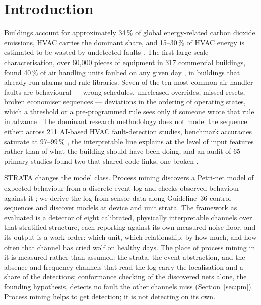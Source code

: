 \documentclass[11pt,letterpaper]{article}
\begin{document}
\section{Introduction}

Buildings account for approximately 34\,\% of global energy-related carbon dioxide emissions, HVAC carries the dominant share, and 15--30\,\% of HVAC energy is estimated to be wasted by undetected faults \cite{bi2024aihvacreview,pritoni2022faultcorrection}. The first large-scale characterisation, over 60{,}000 pieces of equipment in 317 commercial buildings, found 40\,\% of air handling units faulted on any given day \cite{crowe2023faultprevalence}, in buildings that already run alarms and rule libraries. Seven of the ten most common air-handler faults are behavioural --- wrong schedules, unreleased overrides, missed resets, broken economiser sequences --- deviations in the ordering of operating states, which a threshold or a pre-programmed rule sees only if someone wrote that rule in advance \cite{gunay2022logicfaults}. The dominant research methodology does not model the sequence either: across 211 AI-based HVAC fault-detection studies, benchmark accuracies saturate at 97--99\,\% \cite{bi2024aihvacreview,tun2021hybridrfsvm,prince2025improved1dcnnlstm}, the interpretable line explains at the level of input features \cite{deng2024afgcn,wang2025xmhac} rather than of what the building should have been doing, and an audit of 65 primary studies found two that shared code links, one broken \cite{mukhtar2025reproducibility}.

STRATA changes the model class. Process mining discovers a Petri-net model of expected behaviour from a discrete event log and checks observed behaviour against it \cite{vanderaalst2016processmining}; we derive the log from sensor data along Guideline~36 control sequences and discover models at device and unit strata. The framework as evaluated is a detector of eight calibrated, physically interpretable channels over that stratified structure, each reporting against its own measured noise floor, and its output is a work order: which unit, which relationship, by how much, and how often that channel has cried wolf on healthy days. The place of process mining in it is measured rather than assumed: the strata, the event abstraction, and the absence and frequency channels that read the log carry the localisation and a share of the detections; conformance checking of the discovered nets alone, the founding hypothesis, detects no fault the other channels miss (Section~\ref{sec:pm}). Process mining helps to get detection; it is not detecting on its own.
\end{document}
